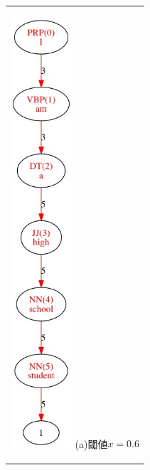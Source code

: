\documentclass[12pt,twoside, fleqn]{ujbook}
\begin{document}
	\begin{figure}[htbp]
	\begin{center}
	\begin{tabular}{c}
		\begin{minipage}{0.5\hsize}
			\begin{center}
			\includegraphics [clip, height=16cm]{./img/pattern_test1.jpeg}
			\hspace{1.6cm} (a)閾値$x=0.6$
			\end{center}
		\end{minipage}


\end{tabular}
\end{center}
\end{figure}
\end{document}
